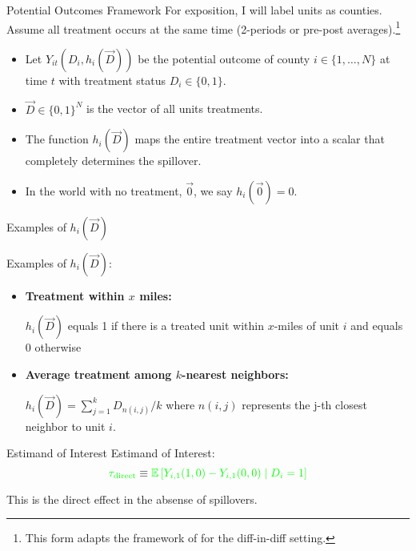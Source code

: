 \documentclass[aspectratio=43]{beamer}
\begin{document}
\begin{frame}{Potential Outcomes Framework}
    For exposition, I will label units as counties. Assume all treatment occurs at the same time (2-periods or pre-post averages).\footnote{This form adapts the framework of \citet{Vazquez-Bare_2019} for the diff-in-diff setting.}
    
    \begin{itemize}
        \item Let $Y_{it}(D_i, h_i(\vec{D}))$ be the potential outcome of county $i \in \{ 1, \dots, N \}$ at time $t$ with treatment status $D_i \in \{0, 1\}$.
        
        \item $\vec{D} \in \{0,1\}^N$ is the vector of all units treatments.
        
        \item The function $h_i(\vec{D})$ maps the entire treatment vector into a scalar that completely determines the spillover. 
        
        \item In the world with no treatment, $\vec{0}$, we say $h_i(\vec{0}) = 0$.
    \end{itemize}
\end{frame}

\begin{frame}{Examples of $h_i(\vec{D})$}
    
    Examples of $h_i(\vec{D})$:
    
    \begin{itemize}
        \item \textbf{Treatment within $x$ miles:}
        
        $h_i(\vec{D})$ equals 1 if there is a treated unit within $x$-miles of unit $i$ and equals 0 otherwise
            
        \item \textbf{Average treatment among $k$-nearest neighbors:}
        
        $h_i(\vec{D}) = \sum_{j = 1}^k D_{n(i,j)} / k$ where $n(i,j)$ represents the j-th closest neighbor to unit $i$. 


    \end{itemize}
\end{frame}

\begin{frame}{Estimand of Interest}
    Estimand of Interest: \[ 
        \textcolor{green}{\tau_{\text{direct}}} \equiv \textcolor{green}{\mathbb{E}\left[ Y_{i,1}(1, 0) - Y_{i,1}(0, 0) \mid D_i = 1\right]}
    \]

    This is the direct effect in the absense of spillovers.
\end{frame}
\end{document}
